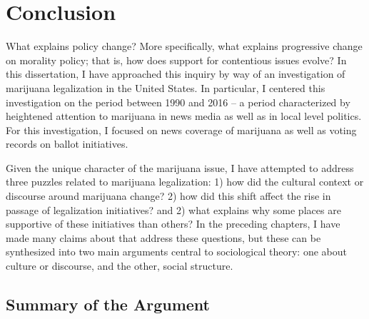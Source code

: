 \chapter{Conclusion}

What explains policy change? More specifically, what explains progressive change on morality policy; that is, how does support for contentious issues evolve? In this dissertation, I have approached this inquiry by way of an investigation of marijuana legalization in the United States. In particular, I centered this investigation on the period between 1990 and 2016 -- a period characterized by heightened attention to marijuana in news media as well as in local level politics. For this investigation, I focused on news coverage of marijuana as well as voting records on ballot initiatives. 

Given the unique character of the marijuana issue, I have attempted to address three puzzles related to marijuana legalization: 1) how did the cultural context or discourse around marijuana change? 2) how did this shift affect the rise in passage of legalization initiatives? and 2) what explains why some places are supportive of these initiatives than others? In the preceding chapters, I have made many claims about that address these questions, but these can be synthesized into two main arguments central to sociological theory: one about culture or discourse, and the other, social structure. 

\section{Summary of the Argument}

